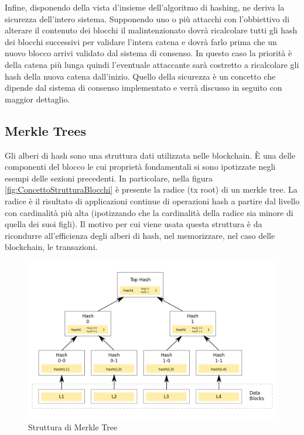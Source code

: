 Infine, disponendo della vista d'insieme dell'algoritmo di hashing, ne deriva la sicurezza dell'intero sistema. Supponendo uno o più attacchi con l'obbiettivo di alterare il contenuto dei blocchi il malintenzionato dovrà ricalcolare tutti gli hash dei blocchi successivi per validare l'intera catena e dovrà farlo prima che un nuovo blocco arrivi validato dal sistema di consenso. In questo caso la priorità è della catena più lunga quindi l’eventuale attaccante sarà costretto a ricalcolare gli hash della nuova catena dall’inizio. Quello della sicurezza è un concetto che dipende dal sistema di consenso implementato e verrà discusso in seguito con maggior dettaglio.

\subsection{Merkle Trees}

Gli alberi di hash sono una struttura dati utilizzata nelle blockchain. È una delle componenti del blocco le cui proprietà fondamentali si sono ipotizzate negli esempi delle sezioni precedenti. In particolare, nella figura \ref{fig:ConcettoStrutturaBlocchi} è presente la radice (tx root) di un merkle tree. La radice è il risultato di applicazioni continue di operazioni hash a partire dal livello con cardinalità più alta (ipotizzando che la cardinalità della radice sia minore di quella dei suoi figli). Il motivo per cui viene usata questa struttura è da ricondurre all'efficienza degli alberi di hash, nel memorizzare, nel caso delle blockchain, le transazioni. 


\begin{figure}[H]
\centering
\includegraphics[width=1\textwidth]{immagini/hash_Trees.png}
\caption{Struttura di Merkle Tree}
\label{fig:MerkleTreeStruttura}

\end{figure}

